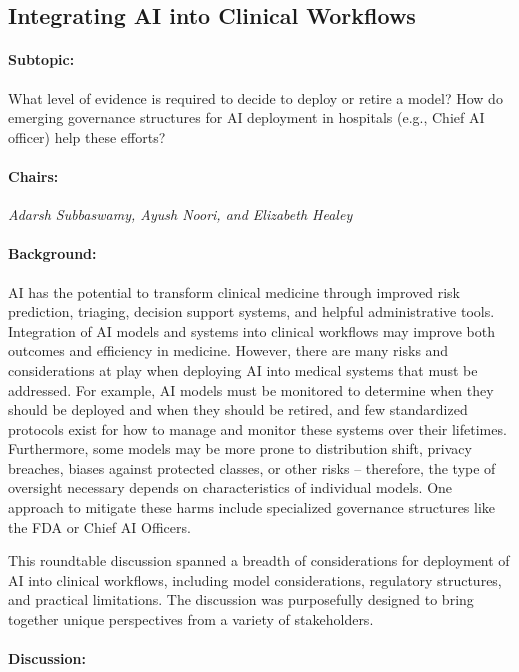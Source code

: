 \subsection{Integrating AI into Clinical Workflows}

\paragraph{Subtopic:} What level of evidence is required to decide to deploy or retire a model? How do emerging governance structures for AI deployment in hospitals (e.g., Chief AI officer) help these efforts? 

\paragraph{Chairs:} \textit{Adarsh Subbaswamy, Ayush Noori, and Elizabeth Healey}

\paragraph{Background:}
AI has the potential to transform clinical medicine through improved risk prediction, triaging, decision support systems, and helpful administrative tools. Integration of AI models and systems into clinical workflows may improve both outcomes and efficiency in medicine. However, there are many risks and considerations at play when deploying AI into medical systems that must be addressed. For example, AI models must be monitored to determine when they should be deployed and when they should be retired, and few standardized protocols exist for how to manage and monitor these systems over their lifetimes. Furthermore, some models may be more prone to distribution shift, privacy breaches, biases against protected classes, or other risks – therefore, the type of oversight necessary depends on characteristics of individual models. One approach to mitigate these harms include specialized governance structures like the FDA or Chief AI Officers.

This roundtable discussion spanned a breadth of considerations for deployment of AI into clinical workflows, including model considerations, regulatory structures, and practical limitations. The discussion was purposefully designed to bring together unique perspectives from a variety of stakeholders.  

\paragraph{Discussion:}

